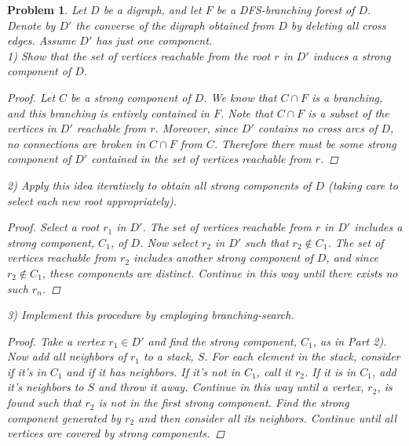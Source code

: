 \documentclass{article}
\newtheorem{problem}{Problem}
\begin{document}
\begin{problem}
Let $D$ be a digraph, and let $F$ be a DFS-branching forest of $D$. Denote by $D'$ the converse of the digraph obtained from $D$ by deleting all cross edges. Assume $D'$ has just one component.\\
1) Show that the set of vertices reachable from the root $r$ in $D'$ induces a strong component of $D$.
\begin{proof}
Let $C$ be a strong component of $D$. We know that $C \cap F$ is a branching, and this branching is entirely contained in $F$. Note that $C \cap F$ is a subset of the vertices in $D'$ reachable from $r$. Moreover, since $D'$ contains no cross arcs of $D$, no connections are broken in $C \cap F$ from $C$. Therefore there must be some strong component of $D'$ contained in the set of vertices reachable from $r$.
\end{proof}
2) Apply this idea iteratively to obtain all strong components of $D$ (taking care to select each new root appropriately).
\begin{proof}
Select a root $r_1$ in $D'$. The set of vertices reachable from $r$ in $D'$ includes a strong component, $C_1$, of $D$. Now select $r_2$ in $D'$ such that $r_2 \notin C_1$. The set of vertices reachable from $r_2$ includes another strong component of $D$, and since $r_2 \notin C_1$, these components are distinct. Continue in this way until there exists no such $r_n$.
\end{proof}
3) Implement this procedure by employing branching-search.
\begin{proof}
Take a vertex $r_1 \in D'$ and find the strong component, $C_1$, as in Part 2). Now add all neighbors of $r_1$ to a stack, $S$. For each element in the stack, consider if it's in $C_1$ and if it has neighbors. If it's not in $C_1$, call it $r_2$. If it is in $C_1$, add it's neighbors to $S$ and throw it away. Continue in this way until a vertex, $r_2$, is found such that $r_2$ is not in the first strong component. Find the strong component generated by $r_2$ and then consider all its neighbors. Continue until all vertices are covered by strong components.
\end{proof}
\end{problem}
\end{document}
